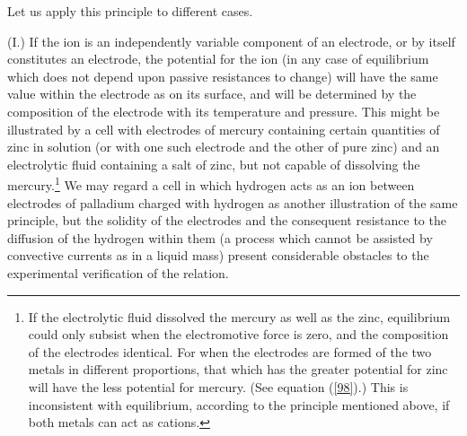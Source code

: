 \documentclass[12pt]{article}
\begin{document}
Let us apply this principle to different cases.

(I.) If the ion is an independently variable component of an electrode, or by itself constitutes an electrode, the potential for the ion (in any case of equilibrium which does not depend upon passive resistances to change) will have the same value within the electrode as on its surface, and will be determined by the composition of the electrode with its temperature and pressure. This might be illustrated by a cell with electrodes of mercury containing certain quantities of zinc in solution (or with one such electrode and the other of pure zinc) and an electrolytic fluid containing a salt of zinc, but not capable of dissolving the mercury.\footnote{If the electrolytic fluid dissolved the mercury as well as the zinc, equilibrium could only subsist when the electromotive force is zero, and the composition of the electrodes identical. For when the electrodes are formed of the two metals in different proportions, that which has the greater potential for zinc will have the less potential for mercury. (See equation (\ref{98}).) This is inconsistent with equilibrium, according to the principle mentioned above, if both metals can act as cations.} We may regard a cell in which hydrogen acts as an ion between electrodes of palladium charged with hydrogen as another illustration of the same principle, but the solidity of the electrodes and the consequent resistance to the diffusion of the hydrogen within them (a process which cannot be assisted by convective currents as in a liquid mass) present considerable obstacles to the experimental verification of the relation.
\end{document}
